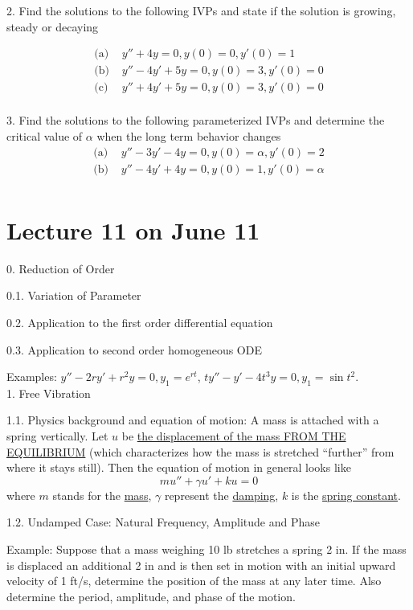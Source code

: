 \documentclass[11pt]{article}
\begin{document}
2. Find the solutions to the following IVPs and state if the solution is growing, steady or decaying

$$\begin{aligned}
\text{(a)  }& y'' + 4y = 0, y(0)=0, y'(0) = 1\\
\text{(b)  }& y'' - 4y' + 5y = 0, y(0) = 3, y'(0)=0\\
\text{(c)  }& y'' + 4y' + 5y = 0, y(0) = 3, y'(0)=0\\
\end{aligned}$$

3. Find the solutions to the following parameterized IVPs and determine the critical value of $\alpha$ when the long term behavior changes
$$\begin{aligned}
\text{(a)  }& y'' - 3y' - 4y = 0, y(0)=\alpha, y'(0) = 2\\
\text{(b)  }& y'' - 4y' + 4y = 0, y(0)=1, y'(0) =\alpha\\
\end{aligned}$$

\newpage
\section{Lecture 11 on June 11}

0. Reduction of Order

0.1. Variation of Parameter

0.2. Application to the first order differential equation

0.3. Application to second order homogeneous ODE

Examples: $y'' - 2ry' + r^2 y = 0, y_1 = e^{rt}$, $ty'' - y' - 4t^3 y = 0, y_1 = \sin t^2$. \\

1. Free Vibration

1.1. Physics background and equation of motion: A mass is attached with a spring vertically. Let $u$ be \underline{the displacement of the mass FROM THE EQUILIBRIUM} (which characterizes how the mass is stretched ``further'' from where it stays still). Then the equation of motion in general looks like
$$m u'' + \gamma u' + k u = 0$$
where $m$ stands for the \underline{mass}, $\gamma$ represent the \underline{damping}, $k$ is the \underline{spring constant}.

1.2. Undamped Case: Natural Frequency, Amplitude and Phase

Example: Suppose that a mass weighing 10 lb stretches a spring 2 in. If the mass is displaced an additional 2 in and is then set in motion with an initial upward velocity of 1 ft/s, determine the position
of the mass at any later time. Also determine the period, amplitude, and phase of the motion.
\end{document}
